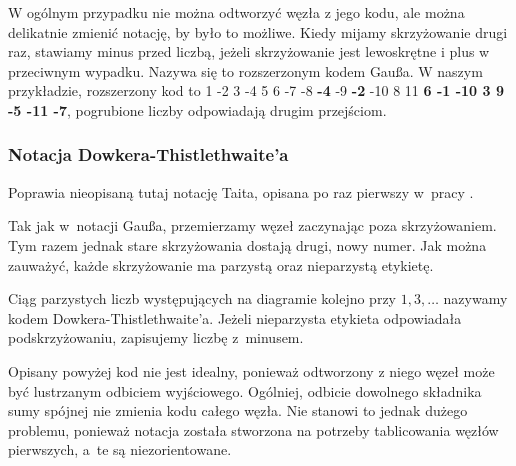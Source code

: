 W ogólnym przypadku nie można odtworzyć węzła z jego kodu, ale można delikatnie zmienić notację, by było to możliwe.
Kiedy mijamy skrzyżowanie drugi raz, stawiamy minus przed liczbą, jeżeli skrzyżowanie jest lewoskrętne i plus w przeciwnym wypadku.
Nazywa się to rozszerzonym kodem Gaußa.
W naszym przykładzie, rozszerzony kod to 1 -2 3 -4 5 6 -7 -8 \textbf{-4} -9 \textbf{-2} -10 8 11 \textbf{6 -1 -10 3 9 -5 -11 -7}, pogrubione liczby odpowiadają drugim przejściom.

\subsubsection{Notacja Dowkera-Thistlethwaite'a}
Poprawia nieopisaną tutaj notację Taita, opisana po raz pierwszy w~pracy \cite{dowker83}.
%
%

Tak jak w~notacji Gaußa, przemierzamy węzeł zaczynając poza skrzyżowaniem.
Tym razem jednak stare skrzyżowania dostają drugi, nowy numer.
Jak można zauważyć, każde skrzyżowanie ma parzystą oraz nieparzystą etykietę.

\begin{definition}
    Ciąg parzystych liczb występujących na diagramie kolejno przy $1, 3, \ldots$ nazywamy kodem Dowkera-Thistlethwaite'a.
    Jeżeli nieparzysta etykieta odpowiadała podskrzyżowaniu, zapisujemy liczbę z~minusem.
\end{definition}

Opisany powyżej kod nie jest idealny, ponieważ odtworzony z niego węzeł może być lustrzanym odbiciem wyjściowego.
Ogólniej, odbicie dowolnego składnika sumy spójnej nie zmienia kodu całego węzła.
Nie stanowi to jednak dużego problemu, ponieważ notacja została stworzona na potrzeby tablicowania węzłów pierwszych, a~te są niezorientowane.

